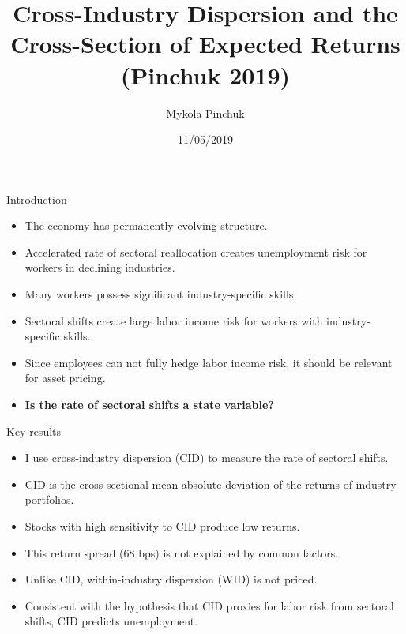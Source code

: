 \documentclass{beamer}
\title{Cross-Industry Dispersion and the Cross-Section of Expected Returns \\ (Pinchuk 2019)}
\author{Mykola Pinchuk}
\date{11/05/2019}
\begin{document}
\begin{frame}
  \titlepage
\end{frame}



\begin{frame}{Introduction}
\begin{itemize}
    \item {The economy has permanently evolving structure.}
    \item {Accelerated rate of sectoral reallocation creates unemployment risk for workers in declining industries.}
    \item {Many workers possess significant industry-specific skills.}
    \item {Sectoral shifts create large labor income risk for workers with industry-specific skills.}
    \item {Since employees can not fully hedge labor income risk, it should be relevant for asset pricing.}
    \item {\textbf{Is the rate of sectoral shifts a state variable?}}
\end{itemize}

\end{frame}


\begin{frame}{Key results}
\begin{itemize}
    \item {I use cross-industry dispersion (CID) to measure the rate of sectoral shifts.}
    \item {CID is the cross-sectional mean absolute deviation of the returns of industry portfolios.}
    \item {Stocks with high sensitivity to CID produce low returns.}
    \item {This return spread (68 bps) is not explained by common factors.}
    \item {Unlike CID, within-industry dispersion (WID) is not priced.}
    \item {Consistent with the hypothesis that CID proxies for labor risk from sectoral shifts, CID predicts unemployment.}
\end{itemize}
\end{frame}
\end{document}
